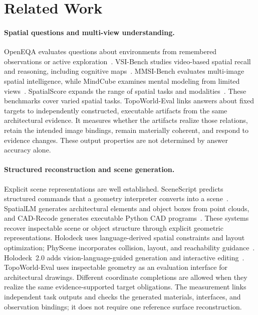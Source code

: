 \section{Related Work}
\label{sec:related}

\paragraph{Spatial questions and multi-view understanding.}
OpenEQA evaluates questions about environments from remembered observations or active exploration~\cite{openeqa2024}.
VSI-Bench studies video-based spatial recall and reasoning, including cognitive maps~\cite{thinkspace2025}.
MMSI-Bench evaluates multi-image spatial intelligence, while MindCube examines mental modeling from limited views~\cite{mmsi2026,mindcube2025}.
SpatialScore expands the range of spatial tasks and modalities~\cite{spatialscore2026}.
These benchmarks cover varied spatial tasks.
TopoWorld-Eval links answers about fixed targets to independently constructed, executable artifacts from the same architectural evidence.
It measures whether the artifacts realize those relations, retain the intended image bindings, remain materially coherent, and respond to evidence changes.
These output properties are not determined by answer accuracy alone.

\paragraph{Structured reconstruction and scene generation.}
Explicit scene representations are well established.
SceneScript predicts structured commands that a geometry interpreter converts into a scene~\cite{scenescript2024}.
SpatialLM generates architectural elements and object boxes from point clouds, and CAD-Recode generates executable Python CAD programs~\cite{spatiallm2025,cadrecode2025}.
These systems recover inspectable scene or object structure through explicit geometric representations.
Holodeck uses language-derived spatial constraints and layout optimization; PhyScene incorporates collision, layout, and reachability guidance~\cite{holodeck2024,physcene2024}.
Holodeck~2.0 adds vision-language-guided generation and interactive editing~\cite{holodeck22025}.
TopoWorld-Eval uses inspectable geometry as an evaluation interface for architectural drawings.
Different coordinate completions are allowed when they realize the same evidence-supported target obligations.
The measurement links independent task outputs and checks the generated materials, interfaces, and observation bindings; it does not require one reference surface reconstruction.

